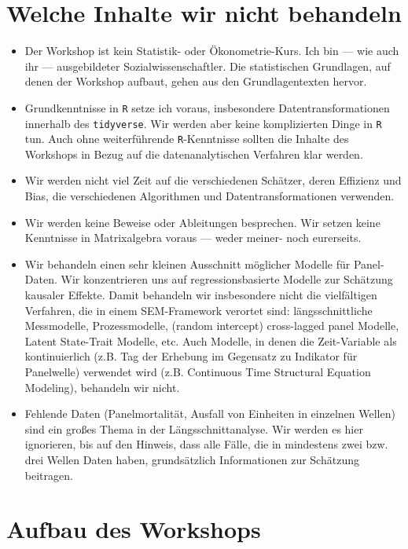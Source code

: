 \documentclass[
]{book}
\begin{document}
\hypertarget{welche-inhalte-wir-nicht-behandeln}{%
\section{Welche Inhalte wir nicht behandeln}\label{welche-inhalte-wir-nicht-behandeln}}

\begin{itemize}
\item
  Der Workshop ist kein Statistik- oder Ökonometrie-Kurs. Ich bin --- wie auch ihr --- ausgebildeter Sozialwissenschaftler. Die statistischen Grundlagen, auf denen der Workshop aufbaut, gehen aus den Grundlagentexten \citep{bellExplainingFixedEffects2015, vaiseyWhatYouCan2017} hervor.
\item
  Grundkenntnisse in \texttt{R} setze ich voraus, insbesondere Datentransformationen innerhalb des \texttt{tidyverse}. Wir werden aber keine komplizierten Dinge in \texttt{R} tun. Auch ohne weiterführende \texttt{R}-Kenntnisse sollten die Inhalte des Workshops in Bezug auf die datenanalytischen Verfahren klar werden.
\item
  Wir werden nicht viel Zeit auf die verschiedenen Schätzer, deren Effizienz und Bias, die verschiedenen Algorithmen und Datentransformationen verwenden.
\item
  Wir werden keine Beweise oder Ableitungen besprechen. Wir setzen keine Kenntnisse in Matrixalgebra voraus --- weder meiner- noch eurerseits.
\item
  Wir behandeln einen sehr kleinen Ausschnitt möglicher Modelle für Panel-Daten. Wir konzentrieren uns auf regressionsbasierte Modelle zur Schätzung kausaler Effekte. Damit behandeln wir insbesondere nicht die vielfältigen Verfahren, die in einem SEM-Framework verortet sind: längsschnittliche Messmodelle, Prozessmodelle, (random intercept) cross-lagged panel Modelle, Latent State-Trait Modelle, etc. Auch Modelle, in denen die Zeit-Variable als kontinuierlich (z.B. Tag der Erhebung im Gegensatz zu Indikator für Panelwelle) verwendet wird (z.B. Continuous Time Structural Equation Modeling), behandeln wir nicht.
\item
  Fehlende Daten (Panelmortalität, Ausfall von Einheiten in einzelnen Wellen) sind ein großes Thema in der Längsschnittanalyse. Wir werden es hier ignorieren, bis auf den Hinweis, dass alle Fälle, die in mindestens zwei bzw. drei Wellen Daten haben, grundsätzlich Informationen zur Schätzung beitragen.
\end{itemize}

\hypertarget{aufbau-des-workshops}{%
\section{Aufbau des Workshops}\label{aufbau-des-workshops}}
\end{document}
